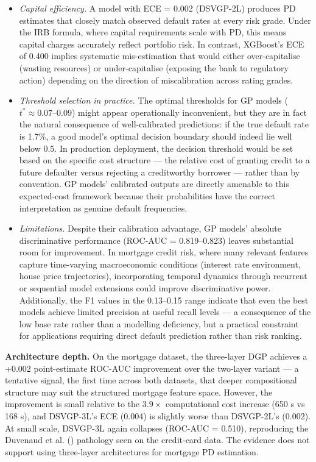 \documentclass[
  letterpaper,
  DIV=11,
  numbers=noendperiod]{scrartcl}
\begin{document}
\begin{itemize}
\item
  \emph{Capital efficiency.} A model with ECE = 0.002 (DSVGP-2L)
  produces PD estimates that closely match observed default rates at
  every risk grade. Under the IRB formula, where capital requirements
  scale with PD, this means capital charges accurately reflect portfolio
  risk. In contrast, XGBoost's ECE of 0.400 implies systematic
  mis-estimation that would either over-capitalise (wasting resources)
  or under-capitalise (exposing the bank to regulatory action) depending
  on the direction of miscalibration across rating grades.
\item
  \emph{Threshold selection in practice.} The optimal thresholds for GP
  models (\(t^* \approx 0.07\)--\(0.09\)) might appear operationally
  inconvenient, but they are in fact the natural consequence of
  well-calibrated predictions: if the true default rate is 1.7\%, a good
  model's optimal decision boundary should indeed lie well below 0.5. In
  production deployment, the decision threshold would be set based on
  the specific cost structure --- the relative cost of granting credit
  to a future defaulter versus rejecting a creditworthy borrower ---
  rather than by convention. GP models' calibrated outputs are directly
  amenable to this expected-cost framework because their probabilities
  have the correct interpretation as genuine default frequencies.
\item
  \emph{Limitations.} Despite their calibration advantage, GP models'
  absolute discriminative performance (ROC-AUC = 0.819--0.823) leaves
  substantial room for improvement. In mortgage credit risk, where many
  relevant features capture time-varying macroeconomic conditions
  (interest rate environment, house price trajectories), incorporating
  temporal dynamics through recurrent or sequential model extensions
  could improve discriminative power. Additionally, the F1 values in the
  0.13--0.15 range indicate that even the best models achieve limited
  precision at useful recall levels --- a consequence of the low base
  rate rather than a modelling deficiency, but a practical constraint
  for applications requiring direct default prediction rather than risk
  ranking.
\end{itemize}

\textbf{Architecture depth.} On the mortgage dataset, the three-layer
DGP achieves a +0.002 point-estimate ROC-AUC improvement over the
two-layer variant --- a tentative signal, the first time across both
datasets, that deeper compositional structure may suit the structured
mortgage feature space. However, the improvement is small relative to
the \(3.9\times\) computational cost increase (650 s vs 168 s), and
DSVGP-3L's ECE (0.004) is slightly worse than DSVGP-2L's (0.002). At
small scale, DSVGP-3L again collapses (ROC-AUC = 0.510), reproducing the
Duvenaud et al. () pathology
seen on the credit-card data. The evidence does not support using
three-layer architectures for mortgage PD estimation.
\end{document}
